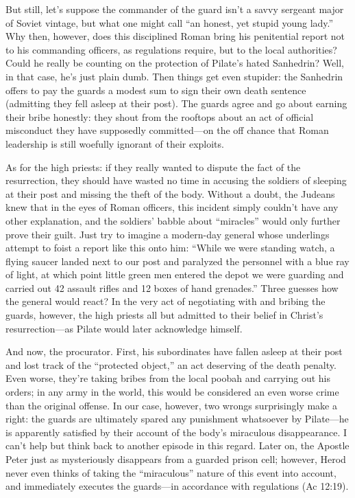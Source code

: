 But still, let's suppose the commander of the guard isn't a savvy sergeant major of Soviet vintage, but what one might call ``an honest, yet stupid young lady.'' Why then, however, does this disciplined Roman bring his penitential report not to his commanding officers, as regulations require, but to the local authorities? Could he really be counting on the protection of Pilate's hated Sanhedrin? Well, in that case, he's just plain dumb. Then things get even stupider: the Sanhedrin offers to pay the guards a modest sum to sign their own death sentence (admitting they fell asleep at their post). The guards agree and go about earning their bribe honestly: they shout from the rooftops about an act of official misconduct they have supposedly committed---on the off chance that Roman leadership is still woefully ignorant of their exploits.

As for the high priests: if they really wanted to dispute the fact of the resurrection, they should have wasted no time in accusing the soldiers of sleeping at their post and missing the theft of the body. Without a doubt, the Judeans knew that in the eyes of Roman officers, this incident simply couldn't have any other explanation, and the soldiers' babble about ``miracles'' would only further prove their guilt. Just try to imagine a modern-day general whose underlings attempt to foist a report like this onto him: ``While we were standing watch, a flying saucer landed next to our post and paralyzed the personnel with a blue ray of light, at which point little green men entered the depot we were guarding and carried out 42 assault rifles and 12 boxes of hand grenades.'' Three guesses how the general would react? In the very act of negotiating with and bribing the guards, however, the high priests all but admitted to their belief in Christ's resurrection---as Pilate would later acknowledge himself.

And now, the procurator. First, his subordinates have fallen asleep at their post and lost track of the ``protected object,'' an act deserving of the death penalty. Even worse, they're taking bribes from the local poobah and carrying out his orders; in any army in the world, this would be considered an even worse crime than the original offense. In our case, however, two wrongs surprisingly make a right: the guards are ultimately spared any punishment whatsoever by Pilate---he is apparently satisfied by their account of the body's miraculous disappearance. I can't help but think back to another episode in this regard. Later on, the Apostle Peter just as mysteriously disappears from a guarded prison cell; however, Herod never even thinks of taking the ``miraculous'' nature of this event into account, and immediately executes the guards---in accordance with regulations (Ac 12:19).

